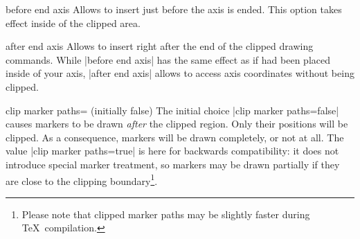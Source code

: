 \begin{pgfplotscodekey}{before end axis}
Allows to insert  just before the axis is ended. This option takes effect inside of the clipped area.
\begin{codeexample}[]
\end{codeexample}
\end{pgfplotscodekey}

\begin{pgfplotscodekey}{after end axis}
Allows to insert  right after the end of the clipped drawing commands. While |before end axis| has the same effect as if  had been placed inside of your axis, |after end axis| allows to access axis coordinates without being clipped.
\begin{codeexample}[]
\end{codeexample}
\end{pgfplotscodekey}

\begin{pgfplotskey}{clip marker paths= (initially false)}
	The initial choice |clip marker paths=false| causes markers to be drawn \emph{after} the clipped region. Only their positions will be clipped. As a consequence, markers will be drawn completely, or not at all. The value |clip marker paths=true| is here for backwards compatibility: it does not introduce special marker treatment, so markers may be drawn partially if they are close to the clipping boundary\footnote{Please note that clipped marker paths may be slightly faster during \TeX\ compilation.}.
\end{pgfplotskey}

